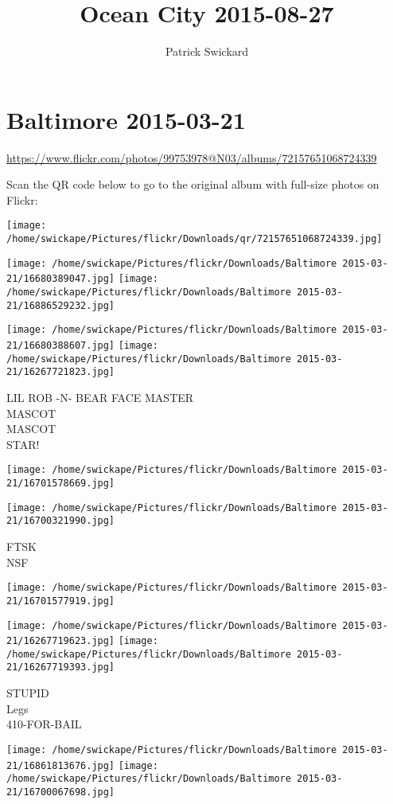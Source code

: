 \documentclass[10pt,letterpaper]{article}
\title{Ocean City 2015-08-27}
\author{Patrick Swickard}
\date{}
\begin{document}
\section*{Baltimore 2015-03-21}

\url{https://www.flickr.com/photos/99753978@N03/albums/72157651068724339}

Scan the QR code below to go to the original album with full-size photos on Flickr:

\texttt{[image: /home/swickape/Pictures/flickr/Downloads/qr/72157651068724339.jpg]}
\pagebreak

\texttt{[image: /home/swickape/Pictures/flickr/Downloads/Baltimore 2015-03-21/16680389047.jpg]}
\texttt{[image: /home/swickape/Pictures/flickr/Downloads/Baltimore 2015-03-21/16886529232.jpg]}

\texttt{[image: /home/swickape/Pictures/flickr/Downloads/Baltimore 2015-03-21/16680388607.jpg]}
\texttt{[image: /home/swickape/Pictures/flickr/Downloads/Baltimore 2015-03-21/16267721823.jpg]}

LIL ROB {-}N{-} BEAR FACE MASTER\\
MASCOT\\
MASCOT\\
STAR!
\pagebreak

\texttt{[image: /home/swickape/Pictures/flickr/Downloads/Baltimore 2015-03-21/16701578669.jpg]}

\vspace{0.25in}
\texttt{[image: /home/swickape/Pictures/flickr/Downloads/Baltimore 2015-03-21/16700321990.jpg]}

FTSK\\
NSF
\pagebreak

\texttt{[image: /home/swickape/Pictures/flickr/Downloads/Baltimore 2015-03-21/16701577919.jpg]}

\vspace{0.25in}
\texttt{[image: /home/swickape/Pictures/flickr/Downloads/Baltimore 2015-03-21/16267719623.jpg]}
\texttt{[image: /home/swickape/Pictures/flickr/Downloads/Baltimore 2015-03-21/16267719393.jpg]}

STUPID\\
Legs\\
410{-}FOR{-}BAIL
\pagebreak

\texttt{[image: /home/swickape/Pictures/flickr/Downloads/Baltimore 2015-03-21/16861813676.jpg]}
\texttt{[image: /home/swickape/Pictures/flickr/Downloads/Baltimore 2015-03-21/16700067698.jpg]}
\end{document}
